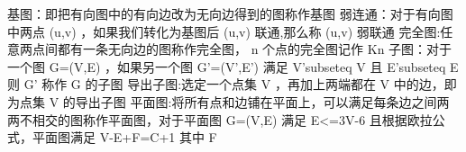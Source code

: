 \markdownRendererDocumentBegin
\markdownRendererSectionBegin
\markdownRendererSectionBegin
{}\markdownRendererInterblockSeparator
{}基图：即把有向图中的有向边改为无向边得到的图称作基图\markdownRendererParagraphSeparator
{}弱连通：对于有向图中两点\markdownRendererDollarSign{} (u,v) \markdownRendererDollarSign{}，如果我们转化为基图后\markdownRendererDollarSign{} (u,v) \markdownRendererDollarSign{}联通,那么称\markdownRendererDollarSign{} (u,v) \markdownRendererDollarSign{}弱联通\markdownRendererParagraphSeparator
{}完全图:任意两点间都有一条无向边的图称作完全图，\markdownRendererDollarSign{} n \markdownRendererDollarSign{}个点的完全图记作\markdownRendererDollarSign{} K\markdownRendererUnderscore{}\markdownRendererLeftBrace{}n\markdownRendererRightBrace{} \markdownRendererDollarSign{}\markdownRendererParagraphSeparator
{}子图：对于一个图\markdownRendererDollarSign{} G=(V,E) \markdownRendererDollarSign{}，如果另一个图\markdownRendererDollarSign{} G\markdownRendererCircumflex{}\markdownRendererLeftBrace{}'\markdownRendererRightBrace{}=(V\markdownRendererCircumflex{}\markdownRendererLeftBrace{}'\markdownRendererRightBrace{},E\markdownRendererCircumflex{}\markdownRendererLeftBrace{}'\markdownRendererRightBrace{}) \markdownRendererDollarSign{}满足\markdownRendererDollarSign{} V\markdownRendererCircumflex{}\markdownRendererLeftBrace{}'\markdownRendererRightBrace{}\markdownRendererBackslash{}subseteq V \markdownRendererDollarSign{}且\markdownRendererDollarSign{} E\markdownRendererCircumflex{}\markdownRendererLeftBrace{}'\markdownRendererRightBrace{}\markdownRendererBackslash{}subseteq E \markdownRendererDollarSign{}则\markdownRendererDollarSign{} G\markdownRendererCircumflex{}\markdownRendererLeftBrace{}'\markdownRendererRightBrace{}\markdownRendererSoftLineBreak
{}\markdownRendererDollarSign{}称作\markdownRendererDollarSign{} G\markdownRendererSoftLineBreak
{}\markdownRendererDollarSign{}的子图\markdownRendererParagraphSeparator
{}导出子图:选定一个点集\markdownRendererDollarSign{} V \markdownRendererDollarSign{}，再加上两端都在\markdownRendererDollarSign{} V\markdownRendererSoftLineBreak
{}\markdownRendererDollarSign{}中的边，即为点集\markdownRendererDollarSign{} V\markdownRendererSoftLineBreak
{}\markdownRendererDollarSign{}的导出子图\markdownRendererParagraphSeparator
{}平面图:将所有点和边铺在平面上，可以满足每条边之间两两不相交的图称作平面图，对于平面图\markdownRendererDollarSign{} G=(V,E) \markdownRendererDollarSign{}满足\markdownRendererDollarSign{} E<=3V-6 \markdownRendererDollarSign{} 且根据欧拉公式，平面图满足\markdownRendererDollarSign{} V-E+F=C+1 \markdownRendererDollarSign{}其中\markdownRendererDollarSign{} F\markdownRendererSoftLineBreak
